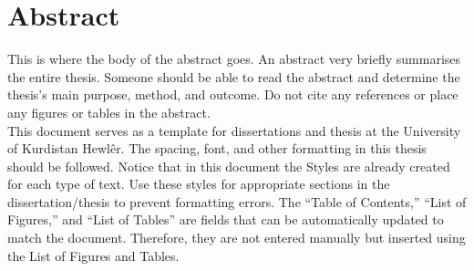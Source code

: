 \chapter*{Abstract}

\begin{justify}
This is where the body of the abstract goes.  An abstract very briefly summarises the entire thesis.  Someone should be able to read the abstract and determine the thesis's main purpose, method, and outcome.  Do not cite any references or place any figures or tables in the abstract. \\

\noindent This document serves as a template for dissertations and thesis at the University of Kurdistan Hewlêr.  The spacing, font, and other formatting in this thesis should be followed.  Notice that in this document the Styles are already created for each type of text.  Use these styles for appropriate sections in the dissertation/thesis to prevent formatting errors.  The “Table of Contents,” “List of Figures,” and “List of Tables” are fields that can be automatically updated to match the document.  Therefore, they are not entered manually but inserted using the List of Figures and Tables.
\end{justify}

\clearpage
